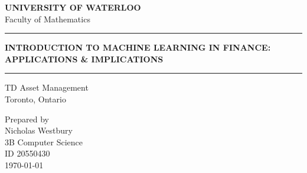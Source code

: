 \documentclass[12pt]{report}
\newcommand{\HRule}[1]{\rule{\linewidth}{#1}}
\begin{document}
\begin{titlepage}
   \begin{center}
    	\normalsize \textbf{\uppercase{University of Waterloo}} \\
		Faculty of Mathematics \\
	\end{center}	
	\begin{center}
		\HRule{0.5pt}
   		\LARGE \textbf{\uppercase{Introduction to Machine Learning in Finance: Applications \& Implications}}
   		\HRule{0.5pt}
	\end{center}
	\begin{center}
	   		\normalsize {TD Asset Management\\ Toronto, Ontario}	
	 
	\end{center}
	\begin{center}
	   		\normalsize {Prepared by\\
				Nicholas Westbury\\
				3B Computer Science\\
				ID 20550430\\
	   		 	\today
	   		 }
	\end{center}
\end{titlepage}
\end{document}
